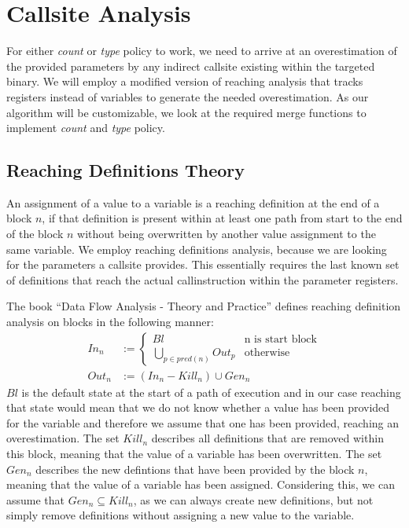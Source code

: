 \section{Callsite Analysis}
\label{section:callsiteanalysis}
For either \emph{count} or \emph{type} policy to work, we need to arrive at an overestimation of the provided parameters by any indirect callsite existing within the targeted binary. We will employ a modified version of reaching analysis that tracks registers instead of variables to generate the needed overestimation. As our algorithm will be customizable, we look at the required merge functions to implement \emph{count} and \emph{type} policy. 

\subsection{Reaching Definitions Theory}
\label{subsection:reachindefinitionstheory}

An assignment of a value to a variable is a reaching definition at the end of a block $n$, if that definition is present within at least one path from start to the end of the block $n$ without being overwritten by another value assignment to the same variable. We employ reaching definitions analysis, because we are looking for the parameters a callsite provides. This essentially requires the last known set of definitions that reach the actual callinstruction within the parameter registers.

The book ``Data Flow Analysis - Theory and Practice'' \cite{khedker2009data} defines reaching definition analysis on blocks in the following manner:
\begin{subequations}
\label{eq:reachingbasedef}
\begin{align}
In_n &:= \left\{
  \begin{array}{lr}
    Bl & \text{n is start block}\\
    \underset{p \in pred(n)}{\bigcup} Out_p & \text{otherwise}
  \end{array}
\right. \label{eq:reachingbasedefInt}\\
Out_n &:= (In_n - Kill_n) \cup Gen_n \label{eq:reachingbasedefOut}
\end{align}
\end{subequations}
$Bl$ is the default state at the start of a path of execution and in our case reaching that state would mean that we do not know whether a value has been provided for the variable and therefore we assume that one has been provided, reaching an overestimation. The set $Kill_n$ describes all definitions that are removed within this block, meaning that the value of a variable has been overwritten. The set $Gen_n$ describes the new defintions that have been provided by the block $n$, meaning that the value of a variable has been assigned. Considering this, we can assume that $Gen_n \subseteq Kill_n$, as we can always create new definitions, but not simply remove definitions without assigning a new value to the variable.


